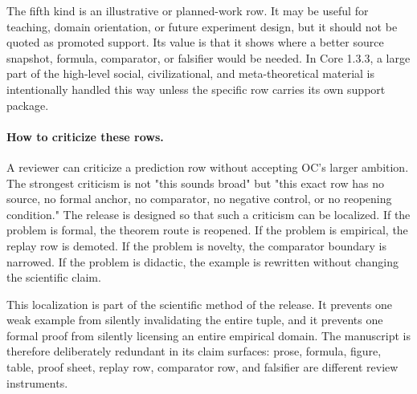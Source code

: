The fifth kind is an illustrative or planned-work row. It may be useful for
teaching, domain orientation, or future experiment design, but it should not be
quoted as promoted support. Its value is that it shows where a better source
snapshot, formula, comparator, or falsifier would be needed. In Core 1.3.3, a
large part of the high-level social, civilizational, and meta-theoretical
material is intentionally handled this way unless the specific row carries its
own support package.

\paragraph{How to criticize these rows.}
A reviewer can criticize a prediction row without accepting OC's larger
ambition. The strongest criticism is not "this sounds broad" but "this exact row
has no source, no formal anchor, no comparator, no negative control, or no
reopening condition." The release is designed so that such a criticism can be
localized. If the problem is formal, the theorem route is reopened. If the
problem is empirical, the replay row is demoted. If the problem is novelty, the
comparator boundary is narrowed. If the problem is didactic, the example is
rewritten without changing the scientific claim.

This localization is part of the scientific method of the release. It prevents
one weak example from silently invalidating the entire tuple, and it prevents
one formal proof from silently licensing an entire empirical domain. The
manuscript is therefore deliberately redundant in its claim surfaces: prose,
formula, figure, table, proof sheet, replay row, comparator row, and falsifier
are different review instruments.

